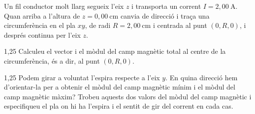 Un fil conductor molt llarg segueix l'eix $z$ i transporta un corrent $I = 2,00\ \mathrm{A}$. Quan arriba a l'altura de $z = 0,00\ \mathrm{cm}$ canvia de direcció i traça una circumferència en el pla $xy$, de radi $R = 2,00\ \mathrm{cm}$ i centrada al punt $(0, R, 0)$, i després continua per l'eix $z$.


\begin{apartat}{1,25}
Calculeu el vector i el mòdul del camp magnètic total al centre de la circumferència, és a dir, al punt $(0, R, 0)$.
\end{apartat}

\begin{apartat}{1,25}
Podem girar a voluntat l'espira respecte a l'eix $y$. En quina direcció hem d'orientar-la per a obtenir el mòdul del camp magnètic mínim i el mòdul del camp magnètic màxim? Trobeu aquests dos valors del mòdul del camp magnètic i especifiqueu el pla on hi ha l'espira i el sentit de gir del corrent en cada cas.
\end{apartat}

